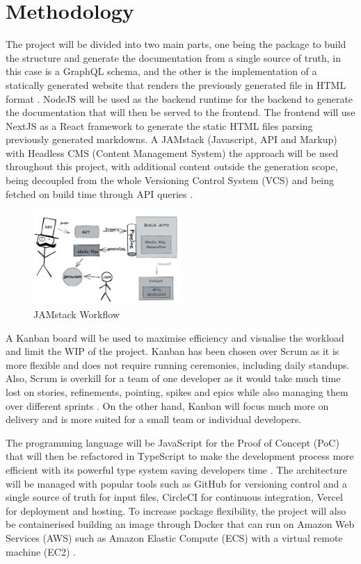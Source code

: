 \section*{Methodology}
\label{s:Methodology}
The project will be divided into two main parts, one being the package to build
the structure and generate the documentation from a single source of truth, in
this case is a GraphQL schema, and the other is the implementation of a
statically generated website that renders the previously generated file in HTML
format \citep{gagliardiDjangoRESTMeets2021}. NodeJS will be used as the backend
runtime for the backend to generate the documentation that will then be served
to the frontend. The frontend will use NextJS as a React framework to generate
the static HTML files parsing previously generated markdowns. A JAMstack
(Javascript, API and Markup) with Headless CMS (Content Management System) the
approach will be used throughout this project, with additional content outside
the generation scope, being decoupled from the whole Versioning Control System
(VCS) and being fetched on build time through API queries
\citep{zammettiWhatJAMstackAll2020}.
\begin{figure}[H]
  \centering
  \includegraphics[width=0.5\textwidth]{figures/jamstack}
  \caption{JAMstack Workflow}
  \label{f:jamstack}
\end{figure}
A Kanban board will be used to maximise efficiency and visualise the workload
and limit the WIP of the project. Kanban has been chosen over Scrum as it is
more flexible and does not require running ceremonies, including daily standups.
Also, Scrum is overkill for a team of one developer as it would take much time
lost on stories, refinements, pointing, spikes and epics while also managing
them over different sprints \citep{zayatFrameworkStudyAgile2020}. On the other
hand, Kanban will focus much more on delivery and is more suited for a small
team or individual developers.

The programming language will be JavaScript for the Proof of Concept (PoC) that
will then be refactored in TypeScript to make the development process more
efficient with its powerful type system saving developers time
\citep{freemanUnderstandingTypeScript2021}. The architecture will be managed
with popular tools such as GitHub for versioning control and a single source of
truth for input files, CircleCI for continuous integration, Vercel for
deployment and hosting. To increase package flexibility, the project will also
be containerised building an image through Docker that can run on Amazon Web
Services (AWS) such as Amazon Elastic Compute (ECS) with a virtual remote
machine (EC2) \citep{pratapyadavFormalApproachDocker2021}.

